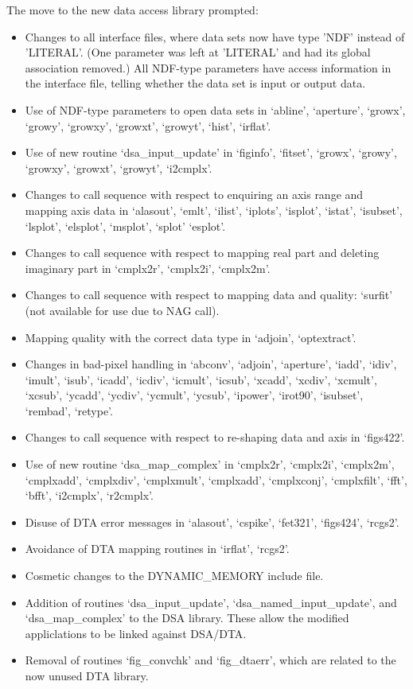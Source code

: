 \documentclass[11pt,twoside]{article}
\begin{document}
   The move to the new data access library prompted:

\begin{itemize}
\item Changes to all interface files, where data sets now have type 'NDF'
      instead of 'LITERAL'.  (One parameter was left at 'LITERAL' and had
      its global association removed.) All NDF-type parameters have access
      information in the interface file, telling whether the data set is
      input or output data.
\item Use of NDF-type parameters to open data sets in `abline', `aperture',
      `growx', `growy', `growxy', `growxt', `growyt', `hist', `irflat'.
\item Use of new routine `dsa\_input\_update' in `figinfo', `fitset',
      `growx', `growy', `growxy', `growxt', `growyt', `i2cmplx'.
\item Changes to call sequence with respect to enquiring an axis range and
      mapping axis data in `alasout', `emlt', `ilist', `iplots',
      `isplot', `istat', `isubset', `lsplot', `elsplot', `msplot',
      `splot' `esplot'.
\item Changes to call sequence with respect to mapping real part and
      deleting imaginary part in `cmplx2r', `cmplx2i', `cmplx2m'.
\item Changes to call sequence with respect to mapping data and quality:
      `surfit' (not available for use due to NAG call).
\item Mapping quality with the correct data type in `adjoin', `optextract'.
\item Changes in bad-pixel handling in `abconv', `adjoin', `aperture',
      `iadd', `idiv', `imult', `isub', `icadd', `icdiv', `icmult',
      `icsub', `xcadd', `xcdiv', `xcmult', `xcsub', `ycadd', `ycdiv',
      `ycmult', `ycsub', `ipower', `irot90', `isubset', `rembad', `retype'.
\item Changes to call sequence with respect to re-shaping data and axis in
      `figs422'.
\item Use of new routine `dsa\_map\_complex' in `cmplx2r', `cmplx2i',
      `cmplx2m', `cmplxadd', `cmplxdiv', `cmplxmult', `cmplxadd',
      `cmplxconj', `cmplxfilt', `fft', `bfft', `i2cmplx', `r2\-cmplx'.
\item Disuse of DTA error messages in `alasout', `cspike', `fet321', `figs424',
      `rcgs2'.
\item Avoidance of DTA mapping routines in `irflat', `rcgs2'.
\item Cosmetic changes to the DYNAMIC\_MEMORY include file.
\item Addition of routines `dsa\_input\_update',
      `dsa\_named\_input\_update', and `dsa\_map\_com\-plex' to the DSA
      library.  These allow the modified appliclations to be linked
      against DSA/DTA.
\item Removal of routines `fig\_convchk' and `fig\_dtaerr', which are
      related to the now unused DTA library.
\end{itemize}
\end{document}
